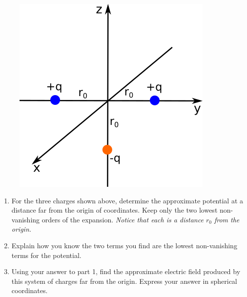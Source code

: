 \documentclass[11pt]{article}
\def\tightlist{}
\begin{document}
\begin{figure}[htbp]
\centering
\includegraphics[width=0.5\linewidth]{./images/hw6/multipole.png}
\end{figure}

\begin{enumerate}
\def\labelenumi{\arabic{enumi}.}
\tightlist
\item
  For the three charges shown above, determine the approximate potential
  at a distance far from the origin of coordinates. Keep only the two
  lowest non-vanishing orders of the expansion. \emph{Notice that each
  is a distance \(r_0\) from the origin.}
\item
  Explain how you know the two terms you find are the lowest
  non-vanishing terms for the potential.
\item
  Using your answer to part 1, find the approximate electric field
  produced by this system of charges far from the origin. Express your
  answer in spherical coordinates.
\end{enumerate}
\end{document}
